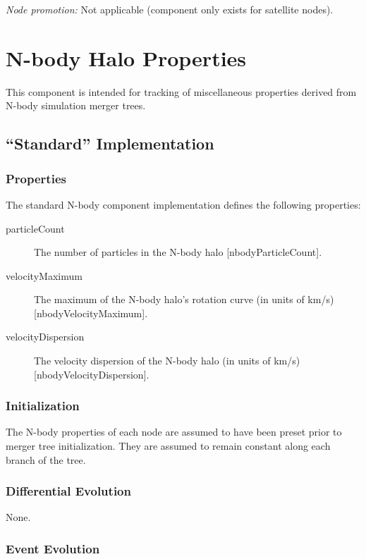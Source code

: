 \noindent\emph{Node promotion:} Not applicable (component only exists for satellite nodes).\\

\section{N-body Halo Properties}

This component is intended for tracking of miscellaneous properties derived from N-body simulation merger trees.

\subsection{``Standard'' Implementation}

\subsubsection{Properties}

The standard N-body component implementation defines the following properties:
\begin{description}
 \item [{\normalfont \ttfamily particleCount}] The number of particles in the N-body halo [{\normalfont \ttfamily nbodyParticleCount}].
 \item [{\normalfont \ttfamily velocityMaximum}] The maximum of the N-body halo's rotation curve (in units of km/s) [{\normalfont \ttfamily nbodyVelocityMaximum}].
 \item [{\normalfont \ttfamily velocityDispersion}] The velocity dispersion of the N-body halo (in units of km/s) [{\normalfont \ttfamily nbodyVelocityDispersion}].
\end{description}

\subsubsection{Initialization}

The N-body properties of each \gls{node} are assumed to have been preset prior to merger tree initialization. They are assumed to remain constant along each branch of the tree.

\subsubsection{Differential Evolution}

None.

\subsubsection{Event Evolution}

